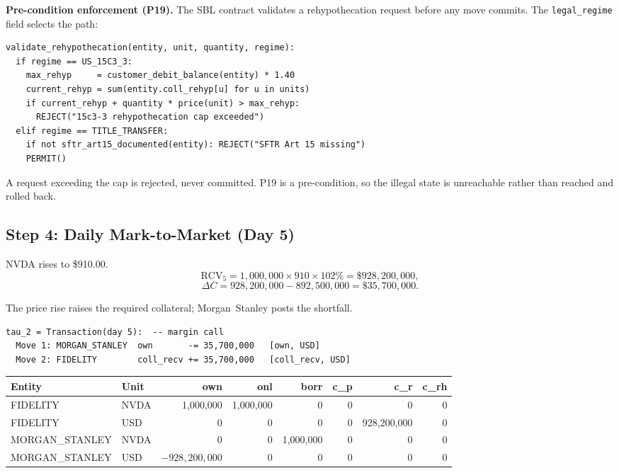 \noindent\textbf{Pre-condition enforcement (P19).} The SBL contract validates a rehypothecation request before any move commits. The \texttt{legal\_regime} field selects the path:

\begin{lstlisting}
validate_rehypothecation(entity, unit, quantity, regime):
  if regime == US_15C3_3:
    max_rehyp     = customer_debit_balance(entity) * 1.40
    current_rehyp = sum(entity.coll_rehyp[u] for u in units)
    if current_rehyp + quantity * price(unit) > max_rehyp:
      REJECT("15c3-3 rehypothecation cap exceeded")
  elif regime == TITLE_TRANSFER:
    if not sftr_art15_documented(entity): REJECT("SFTR Art 15 missing")
    PERMIT()
\end{lstlisting}

\noindent A request exceeding the cap is rejected, never committed. P19 is a pre-condition, so the illegal state is unreachable rather than reached and rolled back.

\subsection{Step 4: Daily Mark-to-Market (Day 5)}
\label{sec:us-step4}

NVDA rises to \$910.00.
\[
\mathrm{RCV}_5 = 1{,}000{,}000 \times 910 \times 102\% = \$928{,}200{,}000,
\]
\[
\Delta C = 928{,}200{,}000 - 892{,}500{,}000 = \$35{,}700{,}000.
\]

\noindent The price rise raises the required collateral; Morgan~Stanley posts the shortfall.

\begin{lstlisting}
tau_2 = Transaction(day 5):  -- margin call
  Move 1: MORGAN_STANLEY  own       -= 35,700,000   [own, USD]
  Move 2: FIDELITY        coll_recv += 35,700,000   [coll_recv, USD]
\end{lstlisting}

\begin{center}\small
\begin{tabular}{l l r r r r r r}
\toprule
\textbf{Entity} & \textbf{Unit} & own & onl & borr & c\_p & c\_r & c\_rh \\
\midrule
FIDELITY & NVDA & 1{,}000{,}000 & 1{,}000{,}000 & 0 & 0 & 0 & 0 \\
FIDELITY & USD & 0 & 0 & 0 & 0 & 928{,}200{,}000 & 0 \\
\midrule
MORGAN\_STANLEY & NVDA & 0 & 0 & 1{,}000{,}000 & 0 & 0 & 0 \\
MORGAN\_STANLEY & USD & $-928{,}200{,}000$ & 0 & 0 & 0 & 0 & 0 \\
\bottomrule
\end{tabular}
\end{center}

